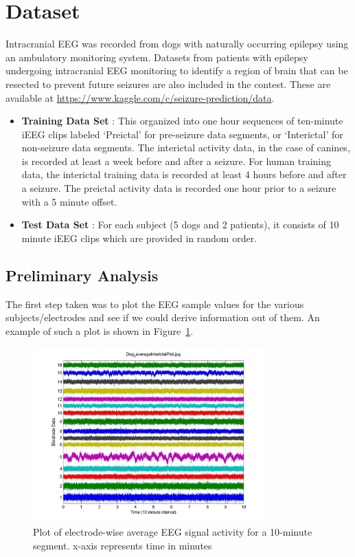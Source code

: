 \documentclass[a4paper]{article}
\begin{document}
\section{Dataset}
Intracranial EEG was recorded from dogs with naturally occurring epilepsy using an ambulatory monitoring system. Datasets from patients with epilepsy undergoing intracranial EEG monitoring to identify a region of brain that can be resected to prevent future seizures are also included in the contest. These are available at \url{https://www.kaggle.com/c/seizure-prediction/data}. 
\begin{itemize}
\item \textbf{Training Data Set} : This organized into one hour sequences of ten-minute iEEG clips labeled `Preictal' for pre-seizure data segments, or `Interictal' for non-seizure data segments. The interictal activity data, in the case of canines, is recorded at least a week before and after a seizure. For human training data, the interictal training data is recorded at least 4 hours before and after a seizure. The preictal activity data is recorded one hour prior to a seizure with a 5 minute offset.
\item \textbf{Test Data Set} : For each subject (5 dogs and 2 patients), it consists of 10 minute iEEG clips which are
provided in random order. 
\end{itemize}

\subsection{Preliminary Analysis}
\label{prelim}
The first step taken was to plot the EEG sample values for the various subjects/electrodes and see if we could derive information out of them. An example of such a plot is shown in Figure~\ref{fig:eeg}.

\begin{figure}
  \centering
    \includegraphics[width=0.8\textwidth]{EEGPlot.jpg}
  \caption{Plot of electrode-wise average EEG signal activity for a 10-minute segment. x-axis represents time in minutes}
  \label{fig:eeg}
\end{figure}
\end{document}
